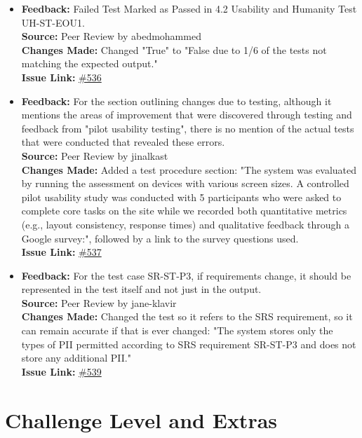 \documentclass{article}
\begin{document}
\begin{itemize}
  \item 
    \textbf{Feedback:} Failed Test Marked as Passed in 4.2 Usability and Humanity Test UH-ST-EOU1. \\
    \textbf{Source:} Peer Review by abedmohammed \\
    \textbf{Changes Made:} Changed "True" to "False due to 1/6 of the tests not matching the expected output." \\
    \textbf{Issue Link:} \href{https://github.com/parishanizam/TeleHealth/issues/536}{\#536}
    
  \item 
    \textbf{Feedback:} For the section outlining changes due to testing, although it mentions the areas of improvement that were discovered through testing and feedback from "pilot usability testing", there is no mention of the actual tests that were conducted that revealed these errors. \\
    \textbf{Source:} Peer Review by jinalkast \\
    \textbf{Changes Made:} Added a test procedure section: "The system was evaluated by running the assessment on devices with various screen sizes. A controlled pilot usability study was conducted with 5 participants who were asked to complete core tasks on the site while we recorded both quantitative metrics (e.g., layout consistency, response times) and qualitative feedback through a Google survey:", followed by a link to the survey questions used. \\
    \textbf{Issue Link:} \href{https://github.com/parishanizam/TeleHealth/issues/537}{\#537}

  \item 
    \textbf{Feedback:} For the test case SR-ST-P3, if requirements change, it should be represented in the test itself and not just in the output. \\
    \textbf{Source:} Peer Review by jane-klavir \\
    \textbf{Changes Made:} Changed the test so it refers to the SRS requirement, so it can remain accurate if that is ever changed: "The system stores only the types of PII permitted according to SRS requirement SR-ST-P3 and does not store any additional PII." \\
    \textbf{Issue Link:} \href{https://github.com/parishanizam/TeleHealth/issues/539}{\#539}

\end{itemize}

\section{Challenge Level and Extras}
\end{document}
